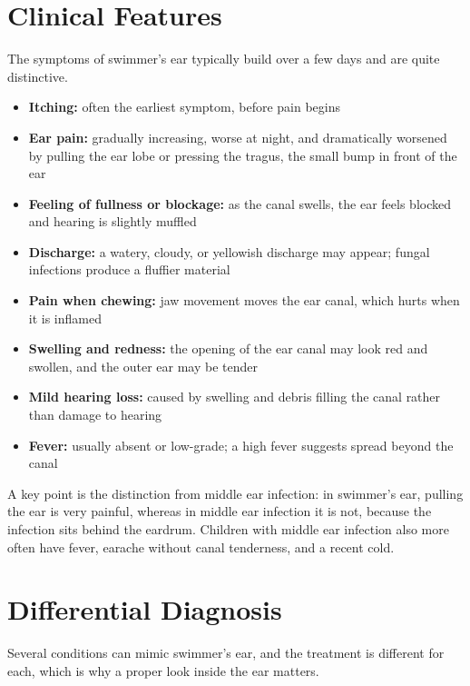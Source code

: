 \section*{Clinical Features}
The symptoms of swimmer's ear typically build over a few days and are quite distinctive.

\begin{itemize}
    \item \textbf{Itching:} often the earliest symptom, before pain begins
    \item \textbf{Ear pain:} gradually increasing, worse at night, and dramatically worsened by pulling the ear lobe or pressing the tragus, the small bump in front of the ear
    \item \textbf{Feeling of fullness or blockage:} as the canal swells, the ear feels blocked and hearing is slightly muffled
    \item \textbf{Discharge:} a watery, cloudy, or yellowish discharge may appear; fungal infections produce a fluffier material
    \item \textbf{Pain when chewing:} jaw movement moves the ear canal, which hurts when it is inflamed
    \item \textbf{Swelling and redness:} the opening of the ear canal may look red and swollen, and the outer ear may be tender
    \item \textbf{Mild hearing loss:} caused by swelling and debris filling the canal rather than damage to hearing
    \item \textbf{Fever:} usually absent or low-grade; a high fever suggests spread beyond the canal
\end{itemize}

A key point is the distinction from middle ear infection: in swimmer's ear, pulling the ear is very painful, whereas in middle ear infection it is not, because the infection sits behind the eardrum. Children with middle ear infection also more often have fever, earache without canal tenderness, and a recent cold.

\section*{Differential Diagnosis}
Several conditions can mimic swimmer's ear, and the treatment is different for each, which is why a proper look inside the ear matters.

